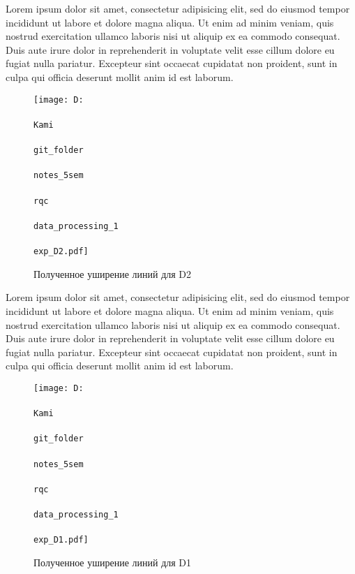 



Lorem ipsum dolor sit amet, consectetur adipisicing elit, sed do eiusmod
tempor incididunt ut labore et dolore magna aliqua. Ut enim ad minim veniam,
quis nostrud exercitation ullamco laboris nisi ut aliquip ex ea commodo
consequat. Duis aute irure dolor in reprehenderit in voluptate velit esse
cillum dolore eu fugiat nulla pariatur. Excepteur sint occaecat cupidatat non
proident, sunt in culpa qui officia deserunt mollit anim id est laborum.


\begin{figure}[h]
    \centering
    \texttt{[image: D:\\\\Kami\\\\git\_folder\\\\notes\_5sem\\\\rqc\\\\data\_processing\_1\\\\exp\_D2.pdf]}
    \caption{Полученное уширение линий для D2}
    \label{fig:expD2}
\end{figure}


Lorem ipsum dolor sit amet, consectetur adipisicing elit, sed do eiusmod
tempor incididunt ut labore et dolore magna aliqua. Ut enim ad minim veniam,
quis nostrud exercitation ullamco laboris nisi ut aliquip ex ea commodo
consequat. Duis aute irure dolor in reprehenderit in voluptate velit esse
cillum dolore eu fugiat nulla pariatur. Excepteur sint occaecat cupidatat non
proident, sunt in culpa qui officia deserunt mollit anim id est laborum.



\begin{figure}[h]
    \centering
    \texttt{[image: D:\\\\Kami\\\\git\_folder\\\\notes\_5sem\\\\rqc\\\\data\_processing\_1\\\\exp\_D1.pdf]}
    \caption{Полученное уширение линий для D1}
    \label{fig:expD2}
\end{figure}